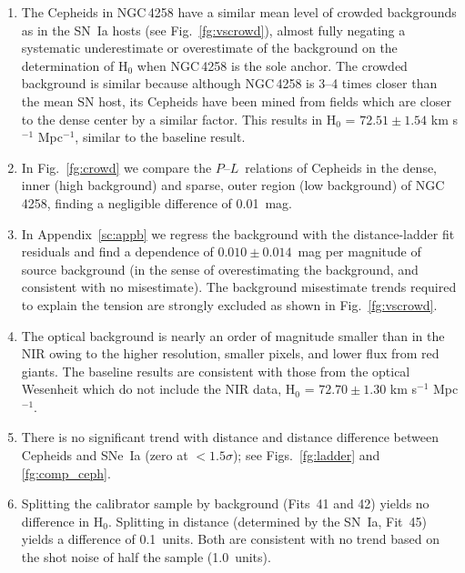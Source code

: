 \documentclass[12pt]{aastex631}
\newcommand{\hmaser}{$ 72.51 \pm 1.54 $ km s$^{-1}$ Mpc$^{-1}$}
\newcommand{\hsopt}{$ 72.70 \pm  1.30  $ km s$^{-1}$ Mpc$^{-1}$}
\newcommand{\PLs}{$P$--$L$\ }
\begin{document}
\begin{enumerate}
    
\item The Cepheids in NGC$\,$4258 have a similar mean level of crowded backgrounds as in the SN~Ia hosts (see Fig.~\ref{fg:vscrowd}), almost fully negating a systematic underestimate or overestimate of the background on the determination of H$_0$ when NGC$\,$4258 is the sole anchor.  The crowded background is similar because although NGC$\,$4258 is 3--4 times closer than the mean SN host, its Cepheids have been mined from fields which are closer to the dense center by a similar factor.  This results in H$_0$ = \hmaser, similar to the baseline result.
       
\item In Fig.~\ref{fg:crowd} we compare the \PLs relations of Cepheids in the dense, inner (high background) and sparse, outer region (low background) of NGC$\,$4258, finding a negligible difference of 0.01~mag.
  
\item In Appendix~\ref{sc:appb} we regress the background with the distance-ladder fit residuals and find a dependence of $0.010\pm0.014$~mag per magnitude of source background (in the sense of overestimating the background, and consistent with no misestimate).  The background misestimate trends required to explain the tension are strongly excluded as shown in Fig.~\ref{fg:vscrowd}.
  
\item The optical background is nearly an order of magnitude smaller than in the NIR owing to the higher resolution, smaller pixels, and lower flux from red giants.  The baseline results are consistent with those from the optical Wesenheit which do not include the NIR data, H$_0$ = \hsopt.
  
\item There is no significant trend with distance and distance difference between Cepheids and SNe~Ia (zero at $<1.5\sigma$); see Figs.~\ref{fg:ladder} and \ref{fg:comp_ceph}.
    
\item Splitting the calibrator sample by background (Fits~41 and 42) yields no difference in H$_0$.  Splitting in distance (determined by the SN~Ia, Fit~45) yields a difference of 0.1~units.  Both are consistent with no trend based on the shot noise of half the sample (1.0~units).
  
\end{enumerate}
\end{document}
